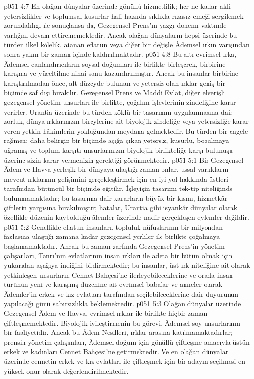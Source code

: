 \vs p051 4:7 En olağan dünyalar üzerinde gönüllü hizmetlilik; her ne kadar akli yetersizlikler ve toplumsal kusurlar hali hazırda sıklıkla rızasız emeği sergilemek zorundalılığı ile sonuçlansa da, Gezegensel Prens’in yazgı dönemi vaktinde varlığını devam ettirememektedir. Ancak olağan dünyaların hepsi üzerinde bu türden ilkel kölelik, atanan eflatun veya diğer bir değişle Âdemsel ırkın varışından sonra yakın bir zaman içinde kaldırılmaktadır.
\vs p051 4:8 Bu altı evrimsel ırka, Âdemsel canlandırıcıların soysal doğumları ile birlikte birleşerek, birbirine karışma ve yüceltilme nihai sonu kazandırılmıştır. Ancak bu insanlar birbirine karıştırılmadan önce, alt düzeyde bulunan ve yetersiz olan ırklar geniş bir biçimde saf dışı bırakılır. Gezegensel Prens ve Maddi Evlat, diğer elverişli gezegensel yönetim unsurları ile birlikte, çoğalım işlevlerinin zindeliğine karar verirler. Urantia üzerinde bu türden köklü bir tasarımın uygulanmasına dair zorluk, dünya ırklarınızın bireylerine ait biyolojik zindeliğe veya yetersizliğe karar veren yetkin hâkimlerin yokluğundan meydana gelmektedir. Bu türden bir engele rağmen; daha belirgin bir biçimde açığa çıkan yetersiz, kusurlu, bozulmaya uğramış ve toplum karşıtı unsurlarınızın biyolojik birlikteliğe karşı bulunuşu üzerine sizin karar vermenizin gerektiği görünmektedir.
\vs p051 5:1 Bir Gezegensel Âdem ve Havva yerleşik bir dünyaya ulaştığı zaman onlar, ussal varlıkların mevcut ırklarının gelişimini gerçekleştirmek için en iyi yol hakkında üstleri tarafından bütüncül bir biçimde eğitilir. İşleyişin tasarımı tek\hyp{}tip niteliğinde bulunmamaktadır; bu tasarıma dair kararların büyük bir kısmı, hizmetkâr çiftlerin yargısına bırakılmıştır; hatalar, Urantia gibi isyankâr dünyalar olarak özellikle düzenin kaybolduğu âlemler üzerinde nadir gerçekleşen eylemler değildir.
\vs p051 5:2 Genellikle eflatun insanları, topluluk nüfuslarının bir milyondan fazlasına ulaştığı zamana kadar gezegensel yerliler ile birlikte çoğalmaya başlamamaktadır. Ancak bu zaman zarfında Gezegensel Prens’in yönetim çalışanları, Tanrı’nın evlatlarının insan ırkları ile adeta bir bütün olmak için yukarıdan aşağıya indiğini bildirmektedir; bu insanlar, üst ırk niteliğine ait olarak yetkinleşen unsurların Cennet Bahçesi’ne ilerleyebileceklerine ve orada insan türünün yeni ve karışmış düzenine ait evrimsel babalar ve anneler olarak Âdemler’in erkek ve kız evlatları tarafından seçilebileceklerine dair duyurunun yapılacağı günü sabırsızlıkla beklemektedir.
\vs p051 5:3 Olağan dünyalar üzerinde Gezegensel Âdem ve Havva, evrimsel ırklar ile birlikte hiçbir zaman çiftleşmemektedir. Biyolojik iyileştirmenin bu görevi, Âdemsel soy unsurlarının bir faaliyetidir. Ancak bu Âdem Nesilleri, ırklar arasına katılmamaktadırlar; prensin yönetim çalışanları, Âdemsel doğum için gönüllü çiftleşme amacıyla üstün erkek ve kadınları Cennet Bahçesi’ne getirmektedir. Ve en olağan dünyalar üzerinde cennetin erkek ve kız evlatları ile çiftleşmek için bir adayın seçilmesi en yüksek onur olarak değerlendirilmektedir.
